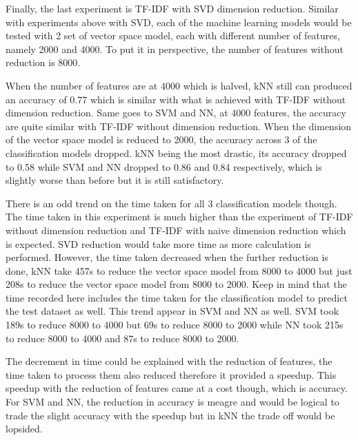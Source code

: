 Finally, the last experiment is TF-IDF with SVD dimension reduction. Similar with experiments above with SVD, each of the machine learning models would be tested with 2 set of vector space model, each with different number of features, namely 2000 and 4000. To put it in perspective, the number of features without reduction is 8000. 

When the number of features are at 4000 which is halved, kNN still can produced an accuracy of 0.77 which is similar with what is achieved with TF-IDF without dimension reduction. Same goes to SVM and NN, at 4000 features, the accuracy are quite similar with TF-IDF without dimension reduction. When the dimension of the vector space model is reduced to 2000, the accuracy across 3 of the classification models dropped. kNN being the most drastic, its accuracy dropped to 0.58 while SVM and NN dropped to 0.86 and 0.84 respectively, which is slightly worse than before but it is still satisfactory. 

There is an odd trend on the time taken for all 3 classification models though. The time taken in this experiment is much higher than the experiment of TF-IDF without dimension reduction and TF-IDF with naive dimension reduction which is expected. SVD reduction would take more time as more calculation is performed. However, the time taken decreased when the further reduction is done, kNN take 457s to reduce the vector space model from 8000 to 4000 but just 208s to reduce the vector space model from 8000 to 2000. Keep in mind that the time recorded here includes the time taken for the classification model to predict the test dataset as well. This trend appear in SVM and NN as well. SVM took 189s to reduce 8000 to 4000 but 69s to reduce 8000 to 2000 while NN took 215s to reduce 8000 to 4000 and 87s to reduce 8000 to 2000. 

The decrement in time could be explained with the reduction of features, the time taken to process them also reduced therefore it provided a speedup. This speedup with the reduction of features came at a cost though, which is accuracy. For SVM and NN, the reduction in accuracy is meagre and would be logical to trade the slight accuracy with the speedup but in kNN the trade off would be lopsided.